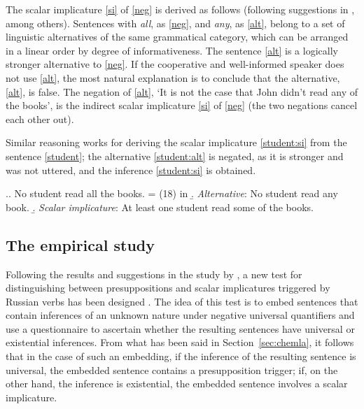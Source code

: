 The scalar implicature \ref{si} of \ref{neg} is derived as follows (following suggestions in \citealp{Grice:75, Ducrot:69, Horn:72}, among others). Sentences with \textit{all}, as \ref{neg}, and \textit{any}, as \ref{alt}, belong to a set of linguistic alternatives of the same grammatical category, which can be arranged in a linear order by degree of informativeness. The sentence \ref{alt} is a logically stronger alternative to \ref{neg}. If the cooperative and well-informed speaker does not use \ref{alt}, the most natural explanation is to conclude that the alternative, \ref{alt}, is false. The negation of \ref{alt}, `It is not the case that John didn't read any of the books', is the indirect scalar implicature \ref{si} of \ref{neg} (the two negations cancel each other out).

Similar reasoning works for deriving the scalar implicature \ref{student:si} from the sentence \ref{student}; the alternative \ref{student:alt} is negated, as it is stronger and was not uttered, and the inference \ref{student:si} is obtained.

\ex.\a. \label{student}No student read all the books. \hfill = (18) in \citealt{Chemla:09}
\b. \label{student:alt} \textit{Alternative}: No student read any book.
\b. \label{student:si} \textit{Scalar implicature}: At least one student read some of the books.

\subsection{The empirical study}\label{empirical}
Following the results and suggestions in the study by \citet{Chemla:09}, a new test for distinguishing between presuppositions and scalar implicatures triggered by Russian verbs has been designed \citep{ZinovaFilip:SALT}. The idea of this test is to embed sentences that contain inferences of an unknown nature under negative universal quantifiers and use a questionnaire to ascertain whether the resulting sentences have universal or existential inferences. From what has been said in Section~\ref{sec:chemla}, it follows that in the case of such an embedding, if the inference of the resulting sentence is universal, the embedded sentence contains a presupposition trigger; if, on the other hand, the inference is existential, the embedded sentence involves a scalar implicature.

